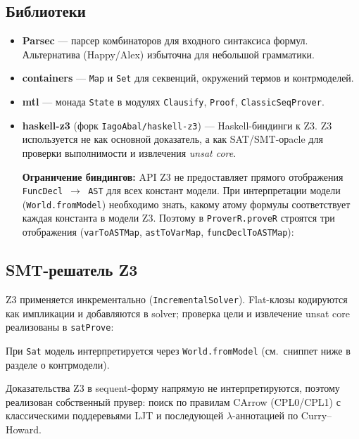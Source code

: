 \documentclass[a4paper,12pt]{article}
\newenvironment{listingcenter}{%
  \begin{center}\begin{minipage}{\linewidth}%
}{%
  \end{minipage}\end{center}%
}
\newcommand{\hssnippet}[2]{%
  \begin{listingcenter}%
  \end{listingcenter}}
\begin{document}
\subsection{Библиотеки}

\begin{itemize}
  \item \textbf{Parsec} --- парсер комбинаторов для входного синтаксиса формул.
        Альтернатива (Happy/Alex) избыточна для небольшой грамматики.

  \item \textbf{containers} --- \texttt{Map} и \texttt{Set} для секвенций,
        окружений термов и контрмоделей.

  \item \textbf{mtl} --- монада \texttt{State} в модулях \texttt{Clausify},
        \texttt{Proof}, \texttt{ClassicSeqProver}.

  \item \textbf{haskell-z3} (форк \texttt{IagoAbal/haskell-z3}) --- Haskell-биндинги
        к Z3. Z3 используется не как основной доказатель, а как SAT/SMT-орacle
        для проверки выполнимости и извлечения \emph{unsat core}.

        \textbf{Ограничение биндингов:} API Z3 не предоставляет прямого
        отображения \texttt{FuncDecl $\to$ AST} для всех констант модели.
        При интерпретации модели (\texttt{World.fromModel}) необходимо знать,
        какому атому формулы соответствует каждая константа в модели Z3.
        Поэтому в \texttt{ProverR.proveR} строятся три отображения
        (\texttt{varToASTMap}, \texttt{astToVarMap}, \texttt{funcDeclToASTMap}):
\hssnippet{funcDecl-map.hs}{Отображения атомов и \texttt{FuncDecl} $\to$ \texttt{AST} в \texttt{proveR}}
\end{itemize}

\subsection{SMT-решатель Z3}

Z3 применяется инкрементально (\texttt{IncrementalSolver}).
Flat-клозы кодируются как импликации и добавляются в solver; проверка цели
и извлечение unsat core реализованы в \texttt{satProve}:
\hssnippet{incremental-satProve.hs}{Кодирование flat-клозов и проверка \texttt{satProve}}

При \texttt{Sat} модель интерпретируется через \texttt{World.fromModel}
(см.~сниппет ниже в разделе о контрмодели).

Доказательства Z3 в sequent-форму напрямую не интерпретируются, поэтому
реализован собственный прувер: поиск по правилам CArrow (CPL0/CPL1) с
классическими поддеревьями LJT и последующей $\lambda$-аннотацией по
Curry--Howard.
\end{document}
